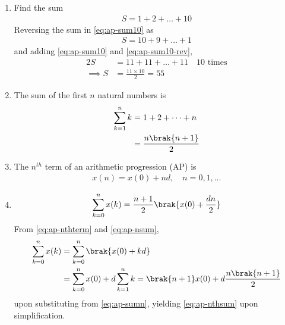 \begin{enumerate}[label=\thesubsection.\arabic*,ref=\thesubsection.\theenumi]
	\item Find the sum
\begin{align}
	\label{eq:ap-sum10}
	S = 1 + 2 + \dots + 10
\end{align}
\solution Reversing the sum in
	\eqref{eq:ap-sum10}
	as
\begin{align}
	\label{eq:ap-sum10-rev}
	S = 10 + 9 + \dots + 1
\end{align}
and adding 
	\eqref{eq:ap-sum10}
	and
	\eqref{eq:ap-sum10-rev},
\begin{align}
	\label{eq:ap-sum10-add}
	2S &= 11 + 11 + \dots + 11 \quad 10 \text{ times}
	\\
	\implies S &= \frac{11 \times 10}{2} = 55
\end{align}
\item The sum of the first $n$ natural numbers is
\begin{align}
	\sum_{k=1}^{n}k &= 1+ 2 + \dots + n
	\\
	&= \frac{n\brak{n+1}}{2}
	\label{eq:ap-sumn}
\end{align}
\item The $n^{th}$ term of an arithmetic progression (AP) is
\begin{align}
	\label{eq:ap-nthterm}
	x(n) = x(0) + nd, \quad n = 0, 1, \dots
\end{align}
\item 
\begin{align}
	\label{eq:ap-nsum}
	 \sum_{k=0}^{n}x(k) = \frac{n+1}{2}\brak{x(0) + \frac{dn}{2}}
\end{align}
\solution
From
	\eqref{eq:ap-nthterm}
	and
	\eqref{eq:ap-nsum},
\begin{align}
	\label{eq:ap-nthsum}
	 \sum_{k=0}^{n}x(k) &= 
\sum_{k=0}^{n}
	 \brak{x(0) + kd} 
	 \\
	 &= 
\sum_{k=0}^{n}x(0) + 
d\sum_{k=1}^{n}k
	  = \brak{n+1}x(0) + d\frac{n\brak{n+1}}{2}
\end{align}
upon substituting from
	\eqref{eq:ap-sumn}, yielding
	\eqref{eq:ap-nthsum}
	upon simplification.
\end{enumerate}
